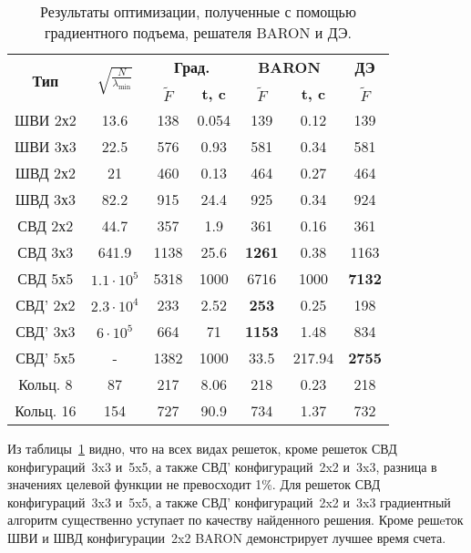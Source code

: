 \begin{table}[!h]
\centering
\caption{ Результаты оптимизации, полученные с помощью градиентного подъема, решателя BARON и ДЭ.}
\begin{tabular}{|c|c|c c|c c|c|}
    \hline
    \multirow{2}{*}{\textbf{Тип}} & \multirow{2}{*}{$\sqrt{\frac{N}{\lambda_{\min}}}$} & \multicolumn{2}{c}{\textbf{Град.}} & \multicolumn{2}{|c|}{\textbf{BARON}} & \textbf{ДЭ}\\
    & & \textbf{$\tilde{F}$} & \textbf{t, c} & \textbf{$\tilde{F}$} & \textbf{t, c} & \textbf{$\tilde{F}$} \\
    \hline
    ШВИ 2х2 & 13.6 & 138 & {0.054} & {139} & 0.12 & {139}  \\
    ШВИ 3х3 & 22.5 & 576 & 0.93 & {581} & {0.34} & {581}  \\
    ШВД 2х2 & 21 & 460 & {0.13} & {464} & 0.27 &  {464}  \\
    ШВД 3х3 & 82.2 & 915 & 24.4 & {925} & {0.34} & 924   \\
    СВД 2х2 & 44.7& 357 & 1.9 & {361} & {0.16} & {361}   \\
    СВД 3х3 & 641.9& 1138 & 25.6 & \textbf{1261} & {0.38} & 1163 \\
    СВД 5х5 & $1.1\cdot10^{5}$ & 5318 & 1000 & 6716 & 1000 & \textbf{7132}  \\
    СВД' 2х2 & $2.3\cdot10^{4}$ & 233 & 2.52 & \textbf{253} & {0.25} & 198  \\
    СВД' 3х3 & $6\cdot10^5$& 664 & 71 & \textbf{1153} & {1.48} & 834  \\
    СВД' 5х5 & - & 1382 & 1000 & 33.5 & 217.94 & \textbf{2755}   \\
    Кольц. 8 & 87 & 217 & 8.06 & 218 & {0.23} & 218  \\
    Кольц. 16 & 154 & 727 & 90.9 & 734 & {1.37} & 732  \\
    \hline
\end{tabular}
\label{tab:results_0}
\end{table}

Из таблицы~\ref{tab:results_0} видно, что на всех видах решеток, кроме решеток СВД конфигураций~3x3 и~5x5, а также СВД' конфигураций~2x2 и~3x3, разница в значениях целевой функции не превосходит 1\%. Для решеток СВД конфигураций~3x3 и~5x5, а также СВД' конфигураций~2x2 и~3x3 градиентный алгоритм существенно уступает по качеству найденного решения. Кроме решeток ШВИ и ШВД конфигурации~2x2 BARON демонстрирует лучшее время счета.

